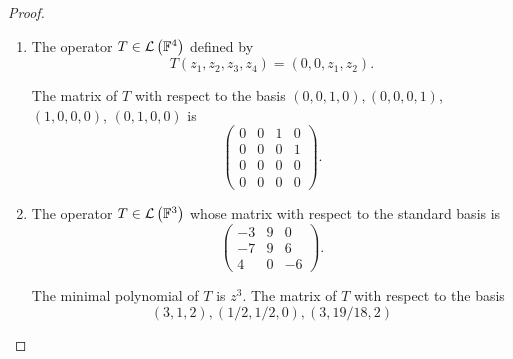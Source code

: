 \begin{proof}
    \begin{enumerate}[label={(\alph*)}]
        \item The operator $T\in\mathcal{L}\left({\mathbb{F}^{4}}\right)$ defined by
              \[
                  T(z_{1}, z_{2}, z_{3}, z_{4}) = (0, 0, z_{1}, z_{2}).
              \]

              The matrix of $T$ with respect to the basis $(0, 0, 1, 0), (0, 0, 0, 1)$, $(1, 0, 0, 0)$, $(0, 1, 0, 0)$ is
              \[
                  \begin{pmatrix}
                      0 & 0 & 1 & 0 \\
                      0 & 0 & 0 & 1 \\
                      0 & 0 & 0 & 0 \\
                      0 & 0 & 0 & 0
                  \end{pmatrix}.
              \]
        \item The operator $T\in\mathcal{L}\left({\mathbb{F}^{3}}\right)$ whose matrix with respect to the standard basis is
              \[
                  \begin{pmatrix}
                      -3 & 9 & 0  \\
                      -7 & 9 & 6  \\
                      4  & 0 & -6
                  \end{pmatrix}.
              \]

              The minimal polynomial of $T$ is $z^{3}$. The matrix of $T$ with respect to the basis
              \[
                  (3, 1, 2), (1/2, 1/2, 0), (3, 19/18, 2)
              \]


\end{enumerate}
\end{proof}

